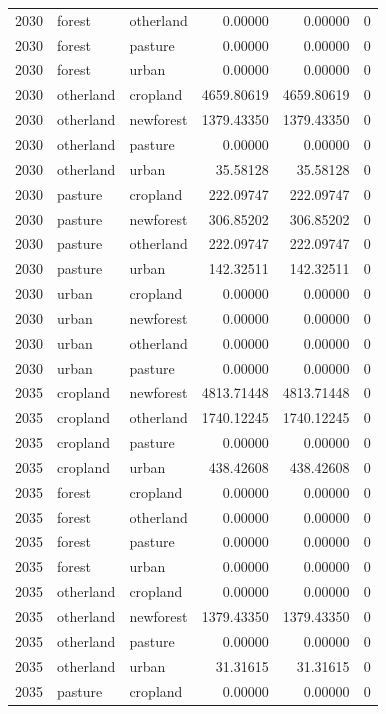 \documentclass[
]{article}
\begin{document}
\begin{longtable}[]{@{}rllrrr@{}}
2030 & forest & otherland & 0.00000 & 0.00000 & 0 \\
2030 & forest & pasture & 0.00000 & 0.00000 & 0 \\
2030 & forest & urban & 0.00000 & 0.00000 & 0 \\
2030 & otherland & cropland & 4659.80619 & 4659.80619 & 0 \\
2030 & otherland & newforest & 1379.43350 & 1379.43350 & 0 \\
2030 & otherland & pasture & 0.00000 & 0.00000 & 0 \\
2030 & otherland & urban & 35.58128 & 35.58128 & 0 \\
2030 & pasture & cropland & 222.09747 & 222.09747 & 0 \\
2030 & pasture & newforest & 306.85202 & 306.85202 & 0 \\
2030 & pasture & otherland & 222.09747 & 222.09747 & 0 \\
2030 & pasture & urban & 142.32511 & 142.32511 & 0 \\
2030 & urban & cropland & 0.00000 & 0.00000 & 0 \\
2030 & urban & newforest & 0.00000 & 0.00000 & 0 \\
2030 & urban & otherland & 0.00000 & 0.00000 & 0 \\
2030 & urban & pasture & 0.00000 & 0.00000 & 0 \\
2035 & cropland & newforest & 4813.71448 & 4813.71448 & 0 \\
2035 & cropland & otherland & 1740.12245 & 1740.12245 & 0 \\
2035 & cropland & pasture & 0.00000 & 0.00000 & 0 \\
2035 & cropland & urban & 438.42608 & 438.42608 & 0 \\
2035 & forest & cropland & 0.00000 & 0.00000 & 0 \\
2035 & forest & otherland & 0.00000 & 0.00000 & 0 \\
2035 & forest & pasture & 0.00000 & 0.00000 & 0 \\
2035 & forest & urban & 0.00000 & 0.00000 & 0 \\
2035 & otherland & cropland & 0.00000 & 0.00000 & 0 \\
2035 & otherland & newforest & 1379.43350 & 1379.43350 & 0 \\
2035 & otherland & pasture & 0.00000 & 0.00000 & 0 \\
2035 & otherland & urban & 31.31615 & 31.31615 & 0 \\
2035 & pasture & cropland & 0.00000 & 0.00000 & 0 \\

\end{longtable}
\end{document}
